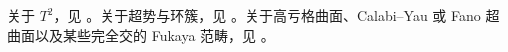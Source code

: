 

\begin{Notes} 关于 $T^2$，见 \cite{PolishchukZaslow, PZ2, LekiliPerutz, LekiliPerutz2}。关于超势与环簇，见 \cite{Auroux:slag, Cho, Cho-Oh, FO3:toric, RitterSmith, Woodward}。关于高亏格曲面、Calabi--Yau 或 Fano 超曲面以及某些完全交的 Fukaya 范畴，见 \cite{Efimov, Sheridan2, Sheridan3, Smith:HFQuadrics}。
\end{Notes}
